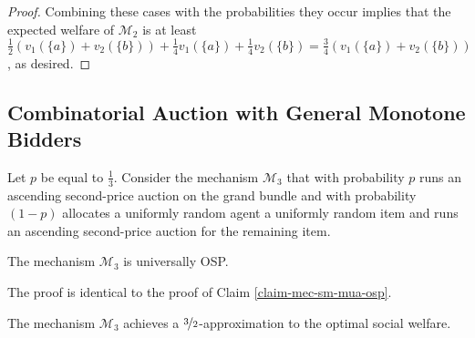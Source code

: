 \begin{proof}
    Combining these cases with the probabilities they occur implies that the expected welfare of $\mathcal M_2$ is at least $\frac{1}{2}\left(v_1(\{a\}) + v_2(\{b\})\right) + \frac{1}{4}v_1(\{a\}) + \frac{1}{4}v_2(\{b\}) = \frac{3}{4}\left(v_1(\{a\}) + v_2(\{b\})\right)$, as desired.
\end{proof}

\subsection{Combinatorial Auction with General Monotone Bidders}\label{subsec:22-ca-general}
Let $p$ be equal to $\frac{1}{3}$. 
Consider the mechanism $\mathcal M_3$ that with probability $p$ runs an ascending second-price auction on the grand bundle and with probability $(1-p)$ allocates a uniformly random agent a uniformly random item and runs an ascending second-price auction for the remaining item. 
\begin{claim}
    The mechanism $\mathcal{M}_3$ is universally OSP.  
\end{claim}
The proof is identical to the proof of Claim \ref{claim-mec-sm-mua-osp}. 
\begin{claim}
The mechanism $\mathcal{M}_3$ achieves a $\nicefrac 3 2$-approximation to the optimal social welfare.
\end{claim}
